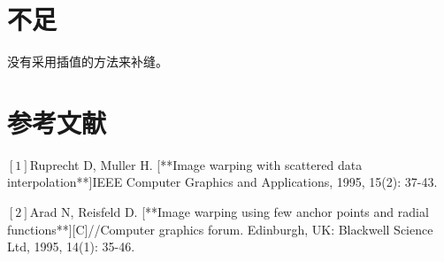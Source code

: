 \documentclass{article}
\begin{document}
	\section{不足}
	没有采用插值的方法来补缝。
\section{参考文献}
  $[1]$Ruprecht D, Muller H. [**Image warping with scattered data 
  interpolation**]IEEE Computer Graphics and Applications, 1995, 15(2): 37-43.
  
  $[2]$Arad N, Reisfeld D. [**Image warping using few anchor points and radial 
  functions**][C]//Computer graphics forum. Edinburgh, UK: Blackwell Science 
  Ltd, 1995, 14(1): 35-46.
\end{document}
